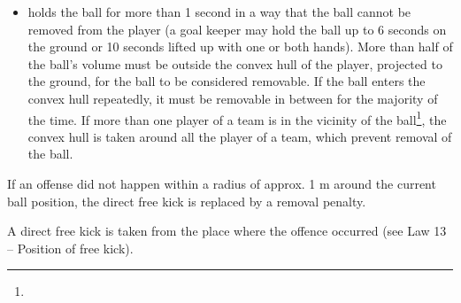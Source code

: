 \begin{itemize}
\item {}holds the ball for more than 1 second in a way that the
  ball cannot be removed from the player (a goal keeper may hold the ball up to
  6 seconds on the ground or 10 seconds lifted up with one or both hands). More than half of the ball's volume must be outside
  the convex hull of the player, projected to the ground, for the ball to be
  considered removable. If the ball enters the convex hull repeatedly, it must
  be removable in between for the majority of the time. If more than one player
  of a team is in the vicinity of the ball\footnote{
  }, the convex hull is taken around all
  the player of a team, which prevent removal of the ball.
\end{itemize}

\bigskip

If an offense did not happen within a radius of approx. 1 m
around the current ball position,
the direct free kick is replaced by a removal penalty.

\bigskip



\bigskip


A direct free kick is taken from the place where the offence occurred (see Law 13 -- Position of free kick). 



\bigskip

